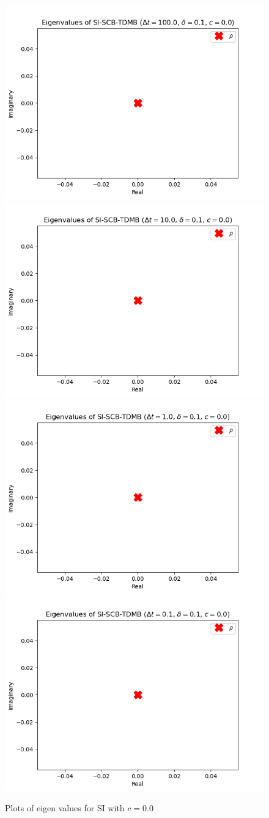 \begin{figure}
    \includegraphics[width=.24\textwidth]{appendix/eig_plots/si/c0/mfp0.1dt100.0c0.0.png}
    \includegraphics[width=.24\textwidth]{appendix/eig_plots/si/c0/mfp0.1dt10.0c0.0.png}
    \includegraphics[width=.24\textwidth]{appendix/eig_plots/si/c0/mfp0.1dt1.0c0.0.png}
    \includegraphics[width=.24\textwidth]{appendix/eig_plots/si/c0/mfp0.1dt0.1c0.0.png}
    
    \caption{Plots of eigen values for SI with $c=0.0$}
    \label{appendix:sic0}
\end{figure}


